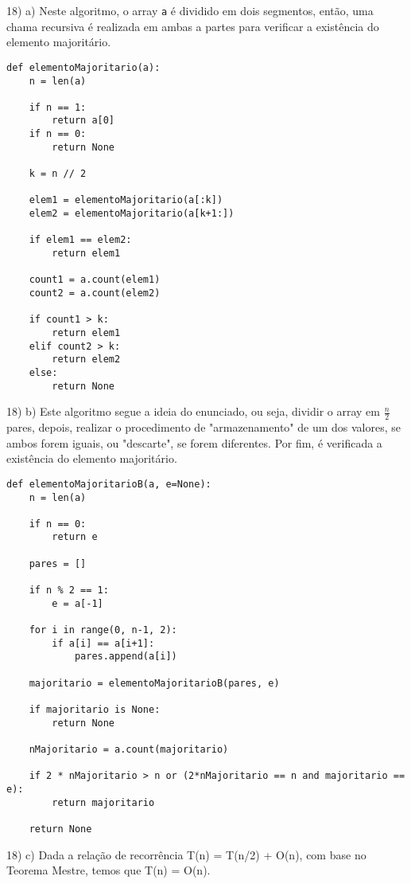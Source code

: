 \documentclass[]{article}
\begin{document}
\newpage

18) a) Neste algoritmo, o array \texttt{a} é dividido em dois segmentos, então, uma chama recursiva é realizada em ambas a partes para verificar a existência do elemento majoritário.

\begin{lstlisting}
def elementoMajoritario(a):
    n = len(a)
    
    if n == 1:
        return a[0]
    if n == 0:
        return None
    
    k = n // 2
    
    elem1 = elementoMajoritario(a[:k])
    elem2 = elementoMajoritario(a[k+1:])
    
    if elem1 == elem2:
        return elem1

    count1 = a.count(elem1)
    count2 = a.count(elem2)

    if count1 > k:
        return elem1
    elif count2 > k:
        return elem2
    else:
        return None
\end{lstlisting}

\newpage

18) b) Este algoritmo segue a ideia do enunciado, ou seja, dividir o array em $\frac{n}{2}$ pares, depois, realizar o procedimento de "armazenamento" de um dos valores, se ambos forem iguais, ou "descarte", se forem diferentes. Por fim, é verificada a existência do elemento majoritário.

\begin{lstlisting}
def elementoMajoritarioB(a, e=None):
    n = len(a)
     
    if n == 0:
        return e
     
    pares = []
     
    if n % 2 == 1:
        e = a[-1]
         
    for i in range(0, n-1, 2):
        if a[i] == a[i+1]:
            pares.append(a[i])
            
    majoritario = elementoMajoritarioB(pares, e)
     
    if majoritario is None:
        return None
     
    nMajoritario = a.count(majoritario)
     
    if 2 * nMajoritario > n or (2*nMajoritario == n and majoritario == e):
        return majoritario
     
    return None
\end{lstlisting}

\vspace{1cm}

18) c) Dada a relação de recorrência T(n) = T(n/2) + O(n), com base no Teorema Mestre, temos que T(n) = O(n).
\end{document}
